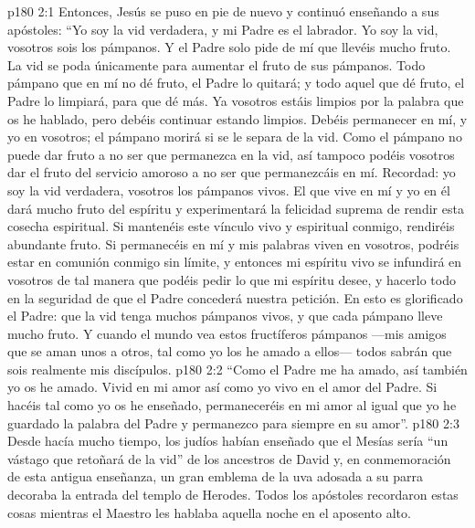 \vs p180 2:1 Entonces, Jesús se puso en pie de nuevo y continuó enseñando a sus apóstoles: “Yo soy la vid verdadera, y mi Padre es el labrador. Yo soy la vid, vosotros sois los pámpanos. Y el Padre solo pide de mí que llevéis mucho fruto. La vid se poda únicamente para aumentar el fruto de sus pámpanos. Todo pámpano que en mí no dé fruto, el Padre lo quitará; y todo aquel que dé fruto, el Padre lo limpiará, para que dé más. Ya vosotros estáis limpios por la palabra que os he hablado, pero debéis continuar estando limpios. Debéis permanecer en mí, y yo en vosotros; el pámpano morirá si se le separa de la vid. Como el pámpano no puede dar fruto a no ser que permanezca en la vid, así tampoco podéis vosotros dar el fruto del servicio amoroso a no ser que permanezcáis en mí. Recordad: yo soy la vid verdadera, vosotros los pámpanos vivos. El que vive en mí y yo en él dará mucho fruto del espíritu y experimentará la felicidad suprema de rendir esta cosecha espiritual. Si mantenéis este vínculo vivo y espiritual conmigo, rendiréis abundante fruto. Si permanecéis en mí y mis palabras viven en vosotros, podréis estar en comunión conmigo sin límite, y entonces mi espíritu vivo se infundirá en vosotros de tal manera que podéis pedir lo que mi espíritu desee, y hacerlo todo en la seguridad de que el Padre concederá nuestra petición. En esto es glorificado el Padre: que la vid tenga muchos pámpanos vivos, y que cada pámpano lleve mucho fruto. Y cuando el mundo vea estos fructíferos pámpanos ---mis amigos que se aman unos a otros, tal como yo los he amado a ellos--- todos sabrán que sois realmente mis discípulos.
\vs p180 2:2 “Como el Padre me ha amado, así también yo os he amado. Vivid en mi amor así como yo vivo en el amor del Padre. Si hacéis tal como yo os he enseñado, permaneceréis en mi amor al igual que yo he guardado la palabra del Padre y permanezco para siempre en su amor”.
\vs p180 2:3 Desde hacía mucho tiempo, los judíos habían enseñado que el Mesías sería “un vástago que retoñará de la vid” de los ancestros de David y, en conmemoración de esta antigua enseñanza, un gran emblema de la uva adosada a su parra decoraba la entrada del templo de Herodes. Todos los apóstoles recordaron estas cosas mientras el Maestro les hablaba aquella noche en el aposento alto.
